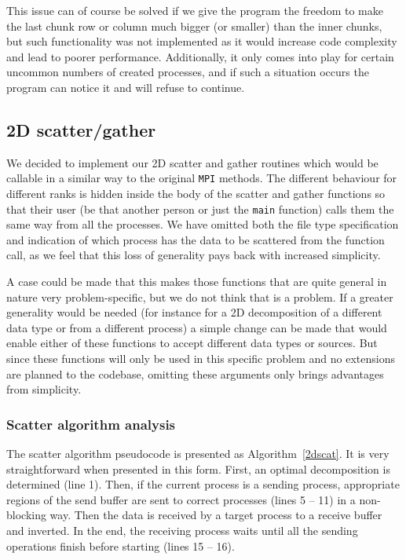 \documentclass[11pt,a4paper]{article}
\begin{document}
This issue can of course be solved if we give the program the freedom to make the last chunk row or column much bigger (or smaller) than the inner chunks, but such functionality was not implemented as it would increase code complexity and lead to poorer performance. 
Additionally, it only comes into play for certain uncommon numbers of created processes, and if such a situation occurs the program can notice it and will refuse to continue.

\subsection{2D scatter/gather}
\label{sec:2dscatgat}
We decided to implement our 2D scatter and gather routines which would be callable in a similar way to the original \texttt{MPI} methods. 
The different behaviour for different ranks is hidden inside the body of the scatter and gather functions so that their user (be that another person or just the \texttt{main} function) calls them the same way from all the processes. 
We have omitted both the file type specification and indication of which process has the data to be scattered from the function call, as we feel that this loss of generality pays back with increased simplicity. 

A case could be made that this makes those functions that are quite general in nature very problem-specific, but we do not think that is a problem. 
If a greater generality would be needed (for instance for a 2D decomposition of a different data type or from a different process) a simple change can be made that would enable either of these functions to accept different data types or sources. 
But since these functions will only be used in this specific problem and no extensions are planned to the codebase, omitting these arguments only brings advantages from simplicity.

\subsubsection{Scatter algorithm analysis}
The scatter algorithm pseudocode is presented as Algorithm~\ref{2dscat}. 
It is very straightforward when presented in this form. First, an optimal decomposition is determined (line 1). 
Then, if the current process is a sending process, appropriate regions of the send buffer are sent to correct processes (lines 5 -- 11) in a non-blocking way. 
Then the data is received by a target process to a receive buffer and inverted. In the end, the receiving process waits until all the sending operations finish before starting (lines 15 -- 16).
\end{document}
